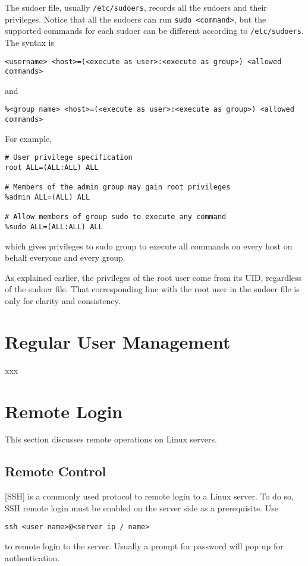 The sudoer file, usually \verb|/etc/sudoers|, records all the sudoers and their privileges. Notice that all the sudoers can run \verb|sudo <command>|, but the supported commands for each sudoer can be different according to \verb|/etc/sudoers|. The syntax is
\begin{lstlisting}
<username> <host>=(<execute as user>:<execute as group>) <allowed commands>
\end{lstlisting}
and
\begin{lstlisting}
%<group name> <host>=(<execute as user>:<execute as group>) <allowed commands>
\end{lstlisting}

For example,
\begin{lstlisting}
# User privilege specification
root ALL=(ALL:ALL) ALL

# Members of the admin group may gain root privileges
%admin ALL=(ALL) ALL

# Allow members of group sudo to execute any command
%sudo ALL=(ALL:ALL) ALL
\end{lstlisting}
which gives privileges to sudo group to execute all commands on every host on behalf everyone and every group.

As explained earlier, the privileges of the root user come from its UID, regardless of the sudoer file. That corresponding line with the root user in the sudoer file is only for clarity and consistency.

\section{Regular User Management}

xxx

\section{Remote Login}

This section discusses remote operations on Linux servers.

\subsection{Remote Control}

[SSH] is a commonly used protocol to remote login to a Linux server. To do so, SSH remote login must be enabled on the server side as a prerequisite. Use
\begin{lstlisting}
ssh <user name>@<server ip / name>
\end{lstlisting} 
to remote login to the server. Usually a prompt for password will pop up for authentication.

